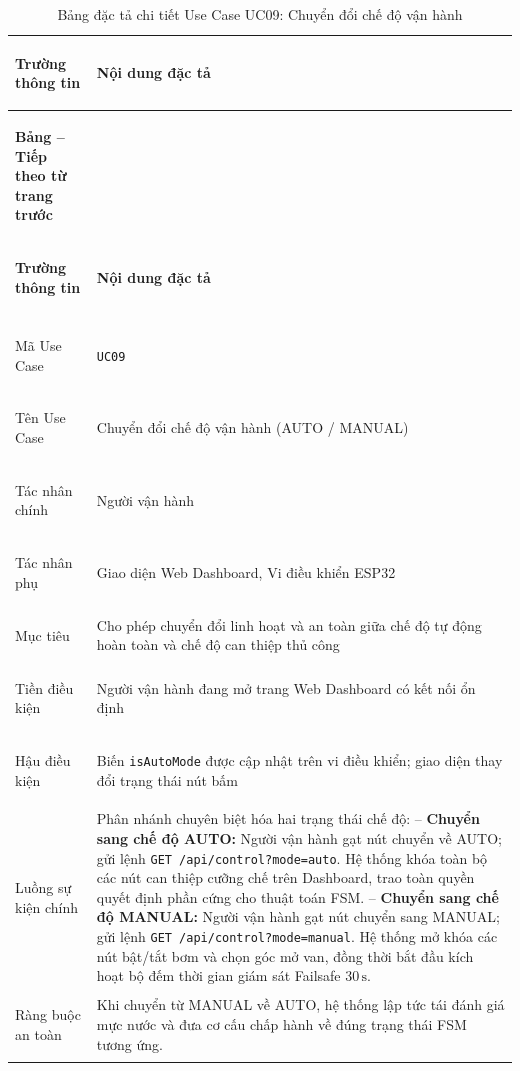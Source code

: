\begingroup
\small
\renewcommand{\arraystretch}{1.2}
\begin{xltabular}{\textwidth}{|>{\bfseries\raggedright\arraybackslash}p{3.2cm}|X|}
\caption{Bảng đặc tả chi tiết Use Case UC09: Chuyển đổi chế độ vận hành} \label{tab:spec_uc09} \\
\hline
\textbf{Trường thông tin} & \textbf{Nội dung đặc tả} \\ \hline
\endfirsthead

{{\bfseries Bảng \thetable{} -- Tiếp theo từ trang trước}} \\
\hline
\textbf{Trường thông tin} & \textbf{Nội dung đặc tả} \\ \hline
\endhead

\hline {} \\ \hline
\endfoot

\hline
\endlastfoot
Mã Use Case & \texttt{UC09} \\ \hline
Tên Use Case & Chuyển đổi chế độ vận hành (AUTO / MANUAL) \\ \hline
Tác nhân chính & Người vận hành \\ \hline
Tác nhân phụ & Giao diện Web Dashboard, Vi điều khiển ESP32 \\ \hline
Mục tiêu & Cho phép chuyển đổi linh hoạt và an toàn giữa chế độ tự động hoàn toàn và chế độ can thiệp thủ công \\ \hline
Tiền điều kiện & Người vận hành đang mở trang Web Dashboard có kết nối ổn định \\ \hline
Hậu điều kiện & Biến \texttt{isAutoMode} được cập nhật trên vi điều khiển; giao diện thay đổi trạng thái nút bấm \\ \hline
Luồng sự kiện chính & 
Phân nhánh chuyên biệt hóa hai trạng thái chế độ: \newline
-- \textbf{Chuyển sang chế độ AUTO:} Người vận hành gạt nút chuyển về AUTO; gửi lệnh \texttt{GET /api/control?mode=auto}. Hệ thống khóa toàn bộ các nút can thiệp cưỡng chế trên Dashboard, trao toàn quyền quyết định phần cứng cho thuật toán FSM. \newline
-- \textbf{Chuyển sang chế độ MANUAL:} Người vận hành gạt nút chuyển sang MANUAL; gửi lệnh \texttt{GET /api/control?mode=manual}. Hệ thống mở khóa các nút bật/tắt bơm và chọn góc mở van, đồng thời bắt đầu kích hoạt bộ đếm thời gian giám sát Failsafe $30\,\text{s}$. \\ \hline
Ràng buộc an toàn & Khi chuyển từ MANUAL về AUTO, hệ thống lập tức tái đánh giá mực nước và đưa cơ cấu chấp hành về đúng trạng thái FSM tương ứng. \\ \hline

\end{xltabular}
\endgroup

